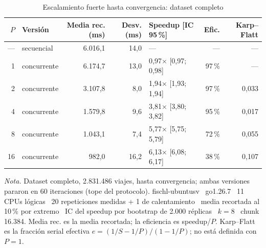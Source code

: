 \begin{table}[H]
\caption{Escalamiento fuerte hasta convergencia: dataset completo}\label{tab:speedup-convergencia}
\footnotesize
\begin{tabular}{@{}rlrrlrr@{}}
\toprule
\textbf{$P$} & \textbf{Versión} & \textbf{Media rec. (ms)} & \textbf{Desv. (ms)} & \textbf{Speedup [IC 95\,\%]} & \textbf{Efic.} & \textbf{Karp--Flatt} \\
\midrule
--- & secuencial & 6.016,1 & 14,0 & --- & --- & --- \\
1 & concurrente & 6.174,7 & 13,0 & 0,97$\times$ [0,97; 0,98] & 97\,\% & --- \\
2 & concurrente & 3.107,8 & 8,0 & 1,94$\times$ [1,93; 1,94] & 97\,\% & 0,033 \\
4 & concurrente & 1.579,8 & 9,6 & 3,81$\times$ [3,80; 3,82] & 95\,\% & 0,017 \\
8 & concurrente & 1.043,1 & 7,4 & 5,77$\times$ [5,75; 5,79] & 72\,\% & 0,055 \\
16 & concurrente & 982,0 & 16,2 & 6,13$\times$ [6,08; 6,17] & 38\,\% & 0,107 \\
\bottomrule
\end{tabular}

{\footnotesize\textit{Nota.} Dataset completo, 2.831.486 viajes, hasta convergencia; ambas versiones pararon en 60 iteraciones (tope del protocolo). fischl-ubuntusv \textperiodcentered\ go1.26.7 \textperiodcentered\ 11 CPUs lógicas \textperiodcentered\ 20 repeticiones medidas + 1 de calentamiento \textperiodcentered\ media recortada al 10\,\% por extremo \textperiodcentered\ IC del speedup por bootstrap de 2.000 réplicas \textperiodcentered\ $k=8$ \textperiodcentered\ chunk 16.384. Media rec. es la media recortada; la eficiencia es speedup/$P$. Karp--Flatt es la fracción serial efectiva $e = (1/S - 1/P)/(1 - 1/P)$; no está definida con $P = 1$.\par}
\end{table}

